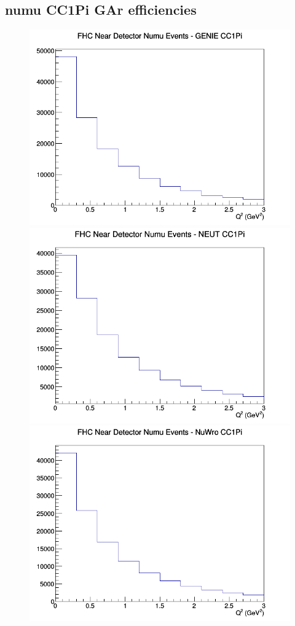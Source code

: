 \subsection{numu CC1Pi GAr efficiencies}
\begin{figure}[h]
\includegraphics[width=\linewidth]{eff_Q2/GAr/CC1Pi_FHC_ND_numu_Q2_GENIE.png}
\endminipage
{}
\includegraphics[width=\linewidth]{eff_Q2/GAr/CC1Pi_FHC_ND_numu_Q2_NEUT.png}
\endminipage
{}
\includegraphics[width=\linewidth]{eff_Q2/GAr/CC1Pi_FHC_ND_numu_Q2_NuWro.png}

\end{figure}
